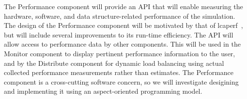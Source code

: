 \documentclass[11pt,letterpaper]{article}
\newcommand{\code}[1]{\textsf{#1}}
\begin{document}
The \code{Performance} component will provide an API that will enable
measuring the hardware, software, and data structure-related
performance of the simulation.  The design of the \code{Performance}
component will be motivated by that of
\code{lcaperf}~\cite{wwwlcaperf}, but will include several
improvements to its run-time efficiency.
The API will allow access to performance data by other components.
This will be used in the \code{Monitor} component to display pertinent
performance information to the user, and by the \code{Distribute}
component for dynamic load balancing using actual collected
performance measurements rather than estimates.  The
\code{Performance} component is a cross-cutting software concern, so
we will investigate desigining and implementing it using an
aspect-oriented programming model.

% 
% 
% 
% 
\end{document}
